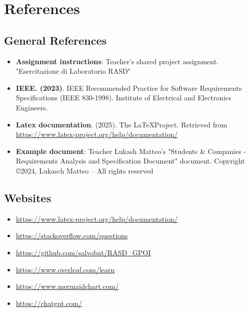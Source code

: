 \documentclass{article}
\begin{document}
\clearpage
\section{References}

\subsection{General References}
\begin{itemize}
    \item \textbf{Assignment instructions}: Teacher's shared project assignment.
    \subitem "Esercitazione di Laboratorio RASD"

    \item \textbf{IEEE. (2023)}. IEEE Recommended Practice for Software Requirements Specifications (IEEE 830-1998). Institute of Electrical and Electronics Engineers.
    
    \item \textbf{Latex documentation}. (2025). The \LaTeX Project. 
    \subitem Retrieved from \url{https://www.latex-project.org/help/documentation/}
    
    \item \textbf{Example document}: Teacher Lukash Matteo's "Students \& Companies - Requirements Analysis and Specification Document" document.
    \subitem Copyright \copyright 2024, Lukasch Matteo – All rights reserved
\end{itemize}

\subsection{Websites}
\begin{itemize}
    
    \item \url{https://www.latex-project.org/help/documentation/}
    
    \item \url{https://stackoverflow.com/questions}

    \item \url{https://github.com/salvobat/RASD_GPOI}
    
    \item \url{https://www.overleaf.com/learn}
    
    \item \url{https://www.mermaidchart.com/}

    \item \url{https://chatgpt.com/}

\end{itemize}
\end{document}
